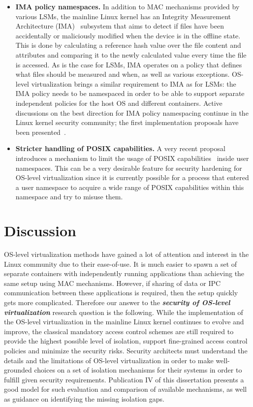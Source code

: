 \begin{itemize}
	\item \textbf{IMA policy namespaces.} In addition to MAC mechanisms provided by various LSMs, the mainline Linux kernel has an Integrity Measurement Architecture (IMA)~\cite{ima} subsystem that aims to detect if files have been accidentally or maliciously modified when the device is in the offline state. This is done by calculating a reference hash value over the file content and attributes and comparing it to the newly calculated value every time the file is accessed. As is the case for LSMs, IMA operates on a policy that defines what files should be measured and when, as well as various exceptions. OS-level virtualization brings a similar requirement to IMA as for LSMs: the IMA policy needs to be namespaced in order to be able to support separate independent policies for the host OS and different containers. Active discussions on the best direction for IMA policy namespacing continue in the Linux kernel security community; the first implementation proposals have been presented~\cite{magalhaes2017}. 
	\item \textbf{Stricter handling of POSIX capabilities.} A very recent proposal~\cite{Bandewar2017} introduces a mechanism to limit the usage of POSIX capabilities~\cite{caps} inside user namespaces. This can be a very desirable feature for security hardening for OS-level virtualization since it is currently possible for a process that entered a user namespace to acquire a wide range of POSIX capabilities within this namespace and try to misuse them. 
\end{itemize}


\section{Discussion}

OS-level virtualization methods have gained a lot of attention and interest in the Linux community due to their ease-of-use. It is much easier to spawn a set of separate containers with independently running applications than achieving the same setup using MAC mechanisms. However, if sharing of data or IPC communication between these applications is required, then the setup quickly gets more complicated. Therefore our answer to the \textbf{\textit{security of OS-level virtualization}} research question is the following. While the implementation of the OS-level virtualization in the mainline Linux kernel continues to evolve and improve, the classical mandatory access control schemes are still required to provide the highest possible level of isolation, support fine-grained access control policies and minimize the security risks. Security architects must understand the details and the limitations of OS-level virtualization in order to make well-grounded choices on a set of isolation mechanisms for their systems in order to fulfill given security requirements. Publication IV of this dissertation presents a good model for such evaluation and comparison of available mechanisms, as well as guidance on identifying the missing isolation gaps. 

